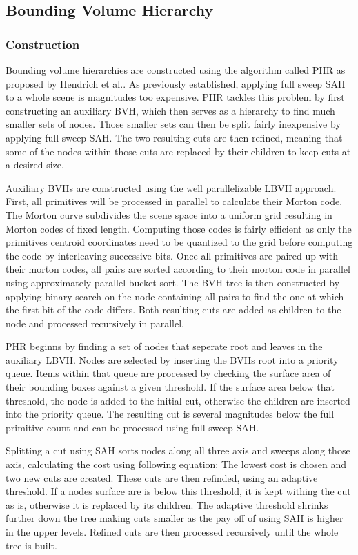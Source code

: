 \subsection{Bounding Volume Hierarchy}
\subsubsection{Construction}
Bounding volume hierarchies are constructed using the algorithm called PHR as proposed by Hendrich et al.\cite{hendrich_parallel_2017}. As previously established, applying full sweep SAH to a whole scene is magnitudes too expensive. PHR tackles this problem by first constructing an auxiliary BVH, which then serves as a hierarchy to find much smaller sets of nodes. Those smaller sets can then be split fairly inexpensive by applying full sweep SAH. The two resulting cuts are then refined, meaning that some of the nodes within those cuts are replaced by their children to keep cuts at a desired size.

Auxiliary BVHs are constructed using the well parallelizable LBVH approach. First, all primitives will be processed in parallel to calculate their Morton code. The Morton curve\cite{morton66curve} subdivides the scene space into a uniform grid resulting in Morton codes of fixed length. Computing those codes is fairly efficient as only the primitives centroid coordinates need to be quantized to the grid before computing the code by interleaving successive bits. Once all primitives are paired up with their morton codes, all pairs are sorted according to their morton code in parallel using approximately parallel bucket sort. The BVH tree is then constructed by applying binary search on the node containing all pairs to find the one at which the first bit of the code differs. Both resulting cuts are added as children to the node and processed recursively in parallel.

PHR beginns by finding a set of nodes that seperate root and leaves in the auxiliary LBVH. Nodes are selected by inserting the BVHs root into a priority queue. Items within that queue are processed by checking the surface area of their bounding boxes against a given threshold. If the surface area below that threshold, the node is added to the initial cut, otherwise the children are inserted into the priority queue. The resulting cut is several magnitudes below the full primitive count and can be processed using full sweep SAH.

Splitting a cut using SAH sorts nodes along all three axis and sweeps along those axis, calculating the cost using following equation: %
The lowest cost is chosen and two new cuts are created. These cuts are then refinded, using an adaptive threshold. If a nodes surface are is below this threshold, it is kept withing the cut as is, otherwise it is replaced by its children. 
The adaptive threshold shrinks further down the tree making cuts smaller as the pay off of using SAH is higher in the upper levels. Refined cuts are then processed recursively until the whole tree is built. 

